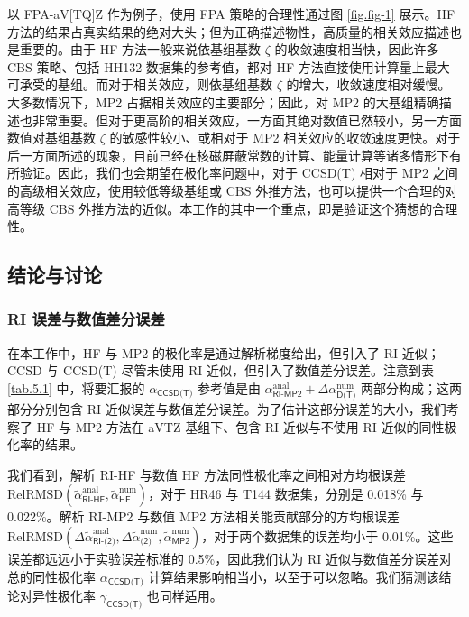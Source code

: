 以 FPA-aV[TQ]Z 作为例子，使用 FPA 策略的合理性通过图 \ref{fig.fig-1} 展示。HF 方法的结果占真实结果的绝对大头；但为正确描述物性，高质量的相关效应描述也是重要的。由于 HF 方法一般来说依基组基数 $\zeta$ 的收敛速度相当快\cite{Jensen-Jensen.TCA.2005, Karton-Martin.TCA.2006}，因此许多 CBS 策略、包括 HH132 数据集的参考值，都对 HF 方法直接使用计算量上最大可承受的基组。而对于相关效应，则依基组基数 $\zeta$ 的增大，收敛速度相对缓慢。大多数情况下，MP2 占据相关效应的主要部分；因此，对 MP2 的大基组精确描述也非常重要。但对于更高阶的相关效应，一方面其绝对数值已然较小，另一方面数值对基组基数 $\zeta$ 的敏感性较小、或相对于 MP2 相关效应的收敛速度更快。对于后一方面所述的现象，目前已经在核磁屏蔽常数的计算\cite{Sun-Xu.JCP.2013, Wang-Xu.JCP.2018, Gregusova-Bartlett.JCTC.2010}、能量计算\cite{Truhlar-Truhlar.CPL.1998}等诸多情形下有所验证。因此，我们也会期望在极化率问题中，对于 CCSD(T) 相对于 MP2 之间的高级相关效应，使用较低等级基组或 CBS 外推方法，也可以提供一个合理的对高等级 CBS 外推方法的近似。本工作的其中一个重点，即是验证这个猜想的合理性。

\subsection{结论与讨论}

\subsubsection{RI 误差与数值差分误差}
\label{sec.5.3.1}

在本工作中，HF 与 MP2 的极化率是通过解析梯度给出，但引入了 RI 近似；CCSD 与 CCSD(T) 尽管未使用 RI 近似，但引入了数值差分误差。注意到表 \ref{tab.5.1} 中，将要汇报的 $\alpha_\textsf{CCSD(T)}$ 参考值是由 $\alpha^\text{anal}_\textsf{RI-MP2} + \Delta \alpha^\text{num}_\textsf{D(T)}$ 两部分构成；这两部分分别包含 RI 近似误差与数值差分误差。为了估计这部分误差的大小，我们考察了 HF 与 MP2 方法在 aVTZ 基组下、包含 RI 近似与不使用 RI 近似的同性极化率的结果。

我们看到，解析 RI-HF 与数值 HF 方法同性极化率之间相对方均根误差 $\text{RelRMSD} (\tilde \alpha_\textsf{RI-HF}^\text{anal}, \tilde \alpha^\text{num}_\textsf{HF})$，对于 HR46 与 T144 数据集，分别是 0.018\% 与 0.022\%。解析 RI-MP2 与数值 MP2 方法相关能贡献部分的方均根误差 $\text{RelRMSD} (\Delta \tilde \alpha^\text{anal}_\textsf{RI-(2)}, \Delta \tilde \alpha^\text{num}_\textsf{(2)}, \tilde \alpha^\text{num}_\textsf{MP2})$，对于两个数据集的误差均小于 0.01\%。这些误差都远远小于实验误差标准的 0.5\%，因此我们认为 RI 近似与数值差分误差对总的同性极化率 $\alpha_\textsf{CCSD(T)}$ 计算结果影响相当小，以至于可以忽略。我们猜测该结论对异性极化率 $\gamma_\textsf{CCSD(T)}$ 也同样适用。

